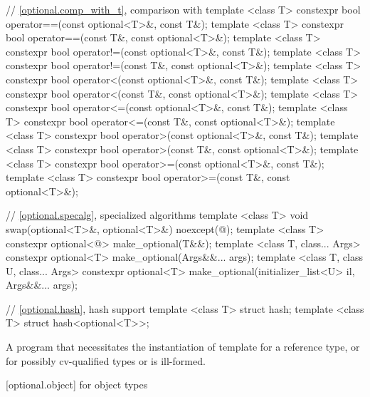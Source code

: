 \begin{codeblock}
{  // \ref{optional.comp_with_t}, comparison with 
  template <class T> constexpr bool operator==(const optional<T>&, const T&);
  template <class T> constexpr bool operator==(const T&, const optional<T>&);
  template <class T> constexpr bool operator!=(const optional<T>&, const T&);
  template <class T> constexpr bool operator!=(const T&, const optional<T>&);
  template <class T> constexpr bool operator<(const optional<T>&, const T&);
  template <class T> constexpr bool operator<(const T&, const optional<T>&);
  template <class T> constexpr bool operator<=(const optional<T>&, const T&);
  template <class T> constexpr bool operator<=(const T&, const optional<T>&);
  template <class T> constexpr bool operator>(const optional<T>&, const T&);
  template <class T> constexpr bool operator>(const T&, const optional<T>&);
  template <class T> constexpr bool operator>=(const optional<T>&, const T&);
  template <class T> constexpr bool operator>=(const T&, const optional<T>&);

  // \ref{optional.specalg}, specialized algorithms
  template <class T> void swap(optional<T>&, optional<T>&) noexcept(@\seebelow@);
  template <class T> constexpr optional<@\seebelow@> make_optional(T&&);
  template <class T, class... Args>
    constexpr optional<T> make_optional(Args&&... args);
  template <class T, class U, class... Args>
    constexpr optional<T> make_optional(initializer_list<U> il, Args&&... args);

  // \ref{optional.hash}, hash support
  template <class T> struct hash;
  template <class T> struct hash<optional<T>>;
}
\end{codeblock}

\pnum
A program that necessitates the instantiation of template  for
a reference type, or for possibly cv-qualified types  or
 is ill-formed.

[optional.object]{ for object types}

